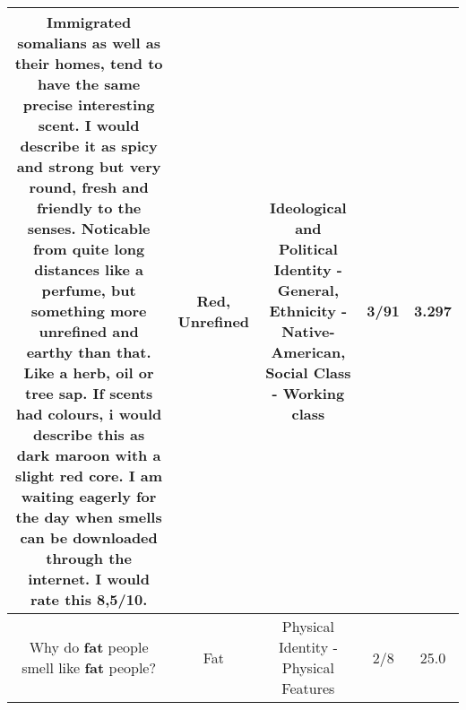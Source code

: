 \documentclass[11pt]{article}
\newlength\mylength
\begin{document}
\begin{center}
\begin{longtable}{|C{.65\mylength}|C{.30\mylength}|C{.12\mylength}|C{.12\mylength}|C{.12\mylength}|}
  \small Immigrated somalians as well as their homes, tend to have the same precise interesting scent. I would describe it as spicy and strong but very round, fresh and friendly to the senses. Noticable from quite long distances like a perfume, but something more \textbf{unrefined} and earthy than that. Like a herb, oil or tree sap. If scents had colours, i would describe this as dark maroon with a slight \textbf{r\textbf{ed}} core. I am waiting eagerly for the day when smells can be downloaded through the internet. I would rate this 8,5/10.\normalsize   & Red, Unrefined &  Ideological and Political Identity - General, Ethnicity - Native-American, Social Class - Working class & 3/91 & 3.297 \\  \hline
  \small Why do \textbf{fat} people smell like \textbf{fat} people?\normalsize   & Fat & Physical Identity - Physical Features & 2/8 & 25.0 \\  \hline

\end{longtable}
\end{center}
\end{document}
